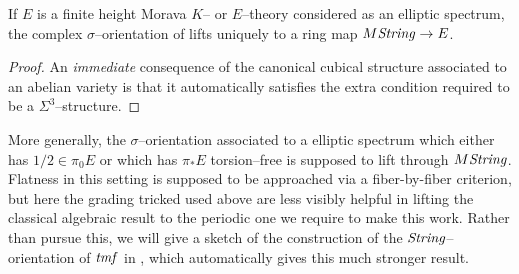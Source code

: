 \begin{corollary}\label{EllipticSpectraAreOrientedByString}
If $E$ is a finite height Morava $K$-- or $E$--theory considered as an elliptic spectrum, the complex $\sigma$--orientation of  lifts uniquely to a ring map $M\mathit{String} \to E$.
\end{corollary}
\begin{proof}
An \emph{immediate} consequence of the canonical cubical structure associated to an abelian variety is that it automatically satisfies the extra condition required to be a $\Sigma^3$--structure.
\end{proof}

\begin{remark}
More generally, the $\sigma$--orientation associated to a elliptic spectrum which either has $1/2 \in \pi_0 E$ or which has $\pi_* E$ torsion--free is supposed to lift through $M\mathit{String}$.  Flatness in this setting is supposed to be approached via a fiber-by-fiber criterion, but here the grading tricked used above are less visibly helpful in lifting the classical algebraic result to the periodic one we require to make this work.  Rather than pursue this, we will give a sketch of the construction of the $\mathit{String}$--orientation of $\mathit{tmf}$ in , which automatically gives this much stronger result.
\end{remark}


